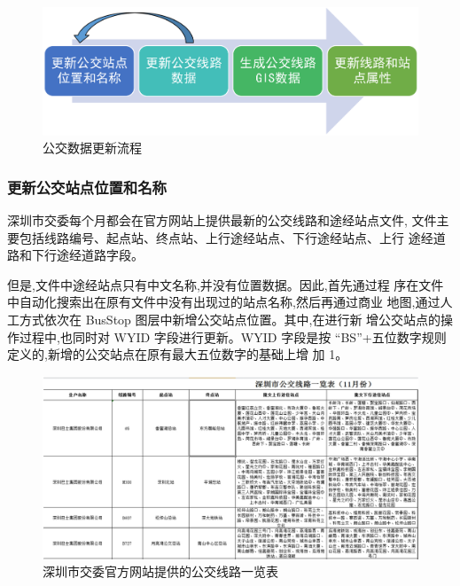 \begin{figure}[ht]
  \centering
  \includegraphics[width=\textwidth]{figures/chp02_公交数据更新流程.png}
  \caption{公交数据更新流程\label{fig:公交数据更新流程} }
\end{figure}

\subsubsection{更新公交站点位置和名称} \label{subsubsec:更新公交站点位置和名称}
深圳市交委每个月都会在官方网站上提供最新的公交线路和途经站点文件,
文件主要包括线路编号、起点站、终点站、上行途经站点、下行途经站点、上行
途经道路和下行途经道路字段。

但是,文件中途经站点只有中文名称,并没有位置数据。因此,首先通过程
序在文件中自动化搜索出在原有文件中没有出现过的站点名称,然后再通过商业
地图,通过人工方式依次在 BusStop 图层中新增公交站点位置。其中,在进行新
增公交站点的操作过程中,也同时对 WYID 字段进行更新。WYID 字段是按
“BS”+五位数字规则定义的,新增的公交站点在原有最大五位数字的基础上增
加 1。

\begin{figure}[!ht]
  \centering
  \includegraphics[width=\textwidth]{figures/chp02_深圳市交委官方网站提供的公交线路一览表.jpg}
  \caption{深圳市交委官方网站提供的公交线路一览表\label{fig:深圳市交委官方网站提供的公交线路一览表} }
\end{figure}

